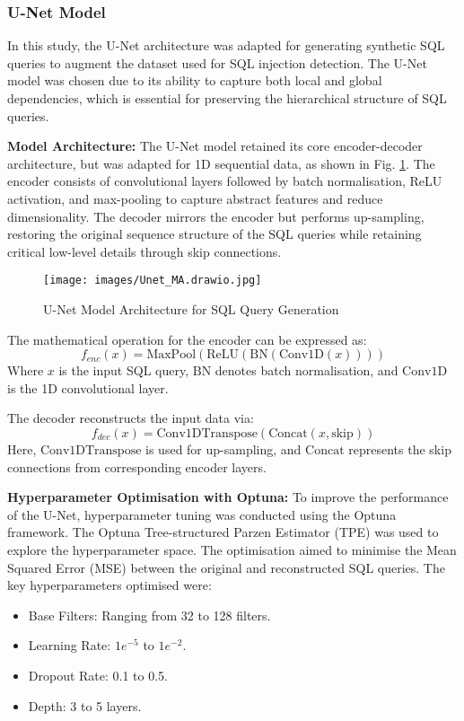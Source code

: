 \documentclass[journal]{IEEEtran}
\begin{document}
\subsubsection{U-Net Model}

In this study, the U-Net architecture was adapted for generating synthetic SQL queries to augment the dataset used for SQL injection detection. The U-Net model was chosen due to its ability to capture both local and global dependencies, which is essential for preserving the hierarchical structure of SQL queries.

\textbf{Model Architecture:} The U-Net model retained its core encoder-decoder architecture, but was adapted for 1D sequential data, as shown in Fig. \ref{fig:unet_architecture}. The encoder consists of convolutional layers followed by batch normalisation, ReLU activation, and max-pooling to capture abstract features and reduce dimensionality. The decoder mirrors the encoder but performs up-sampling, restoring the original sequence structure of the SQL queries while retaining critical low-level details through skip connections.

\begin{figure}[H]
    \centering
    \texttt{[image: images/Unet\_MA.drawio.jpg]}
    \caption{U-Net Model Architecture for SQL Query Generation}
    \label{fig:unet_architecture}
\end{figure}

The mathematical operation for the encoder can be expressed as:
\[
f_{enc}(x) = \text{MaxPool}(\text{ReLU}(\text{BN}(\text{Conv1D}(x))))
\]
Where \( x \) is the input SQL query, \(\text{BN}\) denotes batch normalisation, and \(\text{Conv1D}\) is the 1D convolutional layer.

The decoder reconstructs the input data via:
\[
f_{dec}(x) = \text{Conv1DTranspose}(\text{Concat}(x, \text{skip}))
\]
Here, \(\text{Conv1DTranspose}\) is used for up-sampling, and \(\text{Concat}\) represents the skip connections from corresponding encoder layers.

\textbf{Hyperparameter Optimisation with Optuna:} To improve the performance of the U-Net, hyperparameter tuning was conducted using the Optuna framework. The Optuna Tree-structured Parzen Estimator (TPE) was used to explore the hyperparameter space. The optimisation aimed to minimise the Mean Squared Error (MSE) between the original and reconstructed SQL queries. The key hyperparameters optimised were:
\begin{itemize}
    \item Base Filters: Ranging from 32 to 128 filters.
    \item Learning Rate: \(1e^{-5}\) to \(1e^{-2}\).
    \item Dropout Rate: 0.1 to 0.5.
    \item Depth: 3 to 5 layers.
\end{itemize}
\end{document}
